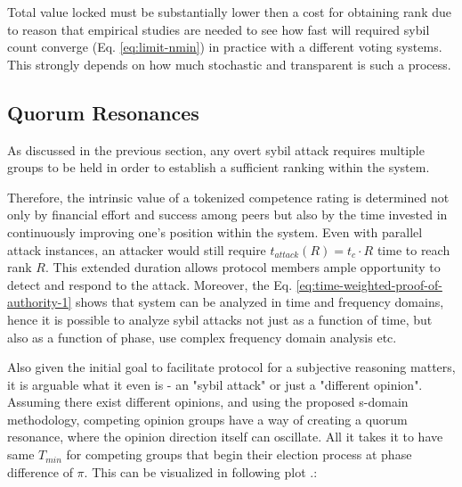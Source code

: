 \documentclass{article}
\begin{document}
\begin{CJK}{UTF8}{gbsn}
    Total value locked must be substantially lower then a cost for obtaining rank due to reason that empirical studies are needed to see how fast will required sybil count converge (Eq. \ref{eq:limit-nmin}) in practice with a different voting systems. This strongly depends on how much stochastic and transparent is such a process.


    \subsection{Quorum Resonances}
    \label{sec:time-constraint}

    As discussed in the previous section, any overt sybil attack requires multiple groups to be held in order to establish a sufficient ranking within the system.

    Therefore, the intrinsic value of a tokenized competence rating is determined not only by financial effort and success among peers but also by the time invested in continuously improving one's position within the system. Even with parallel attack instances, an attacker would still require $t_{attack}(R) = t_c \cdot R$ time to reach rank $R$. This extended duration allows protocol members ample opportunity to detect and respond to the attack.
    Moreover, the Eq. \ref{eq:time-weighted-proof-of-authority-1} shows that system can be analyzed in time and frequency domains, hence it is possible to analyze sybil attacks not just as a function of time, but also as a function of phase, use complex frequency domain analysis etc.

    Also given the initial goal to facilitate protocol for a subjective reasoning matters, it is arguable what it even is - an "sybil attack" or just a "different opinion". Assuming there exist different opinions, and using the proposed s-domain methodology, competing opinion groups have a way of creating a quorum resonance, where the opinion direction itself can oscillate. All it takes it to have same $T_{min}$ for competing groups that begin their election process at phase difference of $\pi$. This can be visualized in following plot .:

    \begin{figure}[ht]
        \centering
\end{figure}
\end{CJK}
\end{document}
